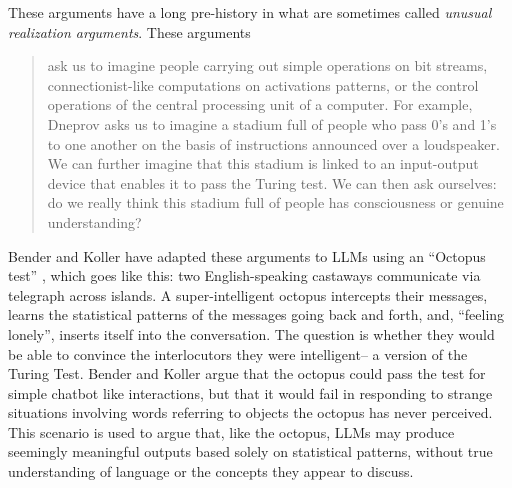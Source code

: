 These arguments have a long pre-history in what are sometimes called \emph{unusual realization arguments}. These arguments
\begin{quote}
ask us to imagine people carrying out simple operations on bit streams, connectionist-like computations on activations patterns, or the control operations of the central processing unit of a computer. For example, Dneprov asks us to imagine a stadium full of people who pass 0’s and 1’s to one another on the basis of instructions announced over a loudspeaker. We can further imagine that this stadium is linked to an input-output device that enables it to pass the Turing test. We can then ask ourselves: do we really think this stadium full of people has consciousness or genuine understanding? \cite{noelle2022artificial}
\end{quote}

Bender and Koller have adapted these arguments to LLMs using an ``Octopus test'' \cite{bender2020climbing}, which goes like this: two English-speaking castaways communicate via telegraph across islands. A super-intelligent octopus intercepts their messages, learns the statistical patterns of the messages going back and forth, and, ``feeling lonely'', inserts itself into the conversation. The question is whether they would be able to convince the interlocutors they were intelligent-- a version of the Turing Test. Bender and Koller argue that the octopus could pass the test for simple chatbot like interactions, but that it would fail in responding to strange situations involving words referring to objects the octopus has never perceived. This scenario is used to argue that, like the octopus, LLMs may produce seemingly meaningful outputs based solely on statistical patterns, without true understanding of language or the concepts they appear to discuss.

